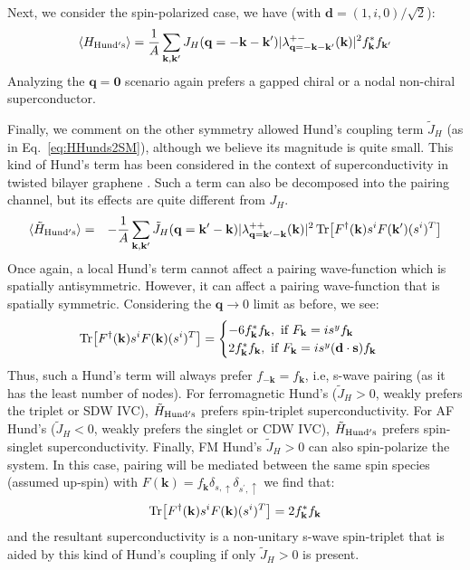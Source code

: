 \documentclass[aps,pra,twocolumn,superscriptaddress,10pt,article,nofootinbib,showpacs,longbibliography]{revtex4-1}
\def \ua{\uparrow}
\def \d{{\mathbf d}}
\def \k{{\mathbf k}}
\def \q{{\mathbf q}}
\def \s{{\mathbf s}}
\def \beq{\begin{eqnarray}}
\def \eeq{\end{eqnarray}}
\begin{document}
Next, we consider the spin-polarized case, we have (with $\d = (1,i,0)/\sqrt{2}$):
\beq
\langle  H_{\rm Hund's} \rangle = \frac{1}{A} \sum_{\k, \k^\prime} J_H(\q = - \k - \k^\prime) |\lambda^{+-}_{\q =  - \k - \k^\prime}(\k)|^2 f_\k^* f_{\k^\prime}
\eeq
Analyzing the $\q = \mathbf{0}$ scenario again prefers a gapped chiral or a nodal non-chiral superconductor.

Finally, we comment on the other symmetry allowed Hund's coupling term $\tilde{J}_H$ (as in Eq.~\eqref{eq:HHunds2SM}), although we believe its magnitude is quite small.
This kind of Hund's term has been considered in the context of superconductivity in twisted bilayer graphene \cite{YV2019,Dodaro}.
Such a term can also be decomposed into the pairing channel, but its effects are quite different from $J_H$.
\beq
\langle  \tilde{H}_{\rm Hund's} \rangle &=&- \frac{1}{A} \sum_{\k, \k^\prime} \tilde{J}_H(\q = \k^\prime -\k) |\lambda^{++}_{\q = \k^\prime - \k}(\k)|^2 \Tr[F^\dagger(\k) s^i F(\k^\prime) (s^i)^T]
\eeq
Once again, a local Hund's term cannot affect a pairing wave-function which is spatially antisymmetric. 
However, it can affect a pairing wave-function that is spatially symmetric.
Considering the $\q \to 0$ limit as before, we see:
\beq
\Tr[F^\dagger(\k) s^i F(\k) (s^i)^T] = \begin{cases} - 6 f_\k^* f_\k, \text{ if } F_\k = i s^y f_\k \\  2 f_\k^* f_\k, \text{ if } F_\k = i s^y (\d \cdot \s) f_\k \end{cases}
\eeq
Thus, such a Hund's term will always prefer $f_{-\k} = f_\k$, i.e, s-wave pairing (as it has the least number of nodes).
For ferromagnetic Hund's ($\tilde{J}_H > 0$, weakly prefers the triplet or SDW IVC), $\tilde{H}_{\rm Hund's}$ prefers spin-triplet superconductivity.
For AF Hund's ($\tilde{J}_H < 0$, weakly prefers the singlet or CDW IVC), $\tilde{H}_{\rm Hund's}$ prefers spin-singlet superconductivity.
Finally, FM Hund's $\tilde{J}_H > 0$ can also spin-polarize the system.
In this case, pairing will be mediated between the same spin species (assumed up-spin) with $F(\k) = f_\k \delta_{s,\ua} \delta_{s^\prime,\ua}$ we find that:
\beq
\Tr[F^\dagger(\k) s^i F(\k) (s^i)^T] = 2 f^*_\k f_\k
\eeq
and the resultant superconductivity is a non-unitary s-wave spin-triplet that is aided by this kind of Hund's coupling if only $\tilde{J}_H > 0$ is present.
\end{document}
